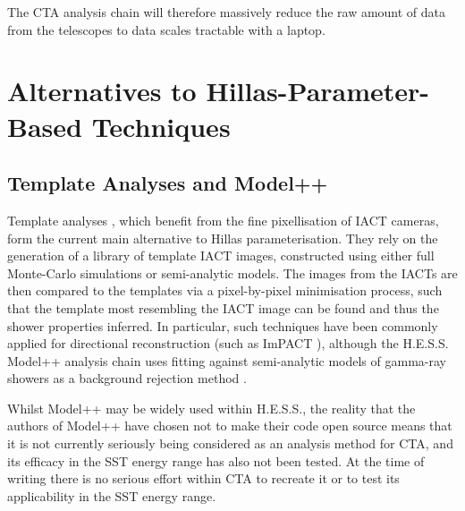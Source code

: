The CTA analysis chain will therefore massively reduce the raw amount of data from the telescopes to data scales tractable with a laptop.


\section{Alternatives to Hillas-Parameter-Based Techniques}

\subsection{Template Analyses and Model++}
Template analyses \cite{cat}\cite{3danalysis}\cite{model++}\cite{impact}, which benefit from the fine pixellisation of IACT cameras, form the current main alternative to Hillas parameterisation. They rely on the generation of a library of template IACT images, constructed using either full Monte-Carlo simulations or semi-analytic models. The images from the IACTs are then compared to the templates via a pixel-by-pixel minimisation process, such that the template most resembling the IACT image can be found and thus the shower properties inferred. In particular, such techniques have been commonly applied for directional reconstruction (such as ImPACT \cite{impact}), although the H.E.S.S. Model++ analysis chain uses fitting against semi-analytic models of gamma-ray showers as a background rejection method \cite{model++}.

Whilst Model++ may be widely used within H.E.S.S., the reality that the authors of Model++ have chosen not to make their code open source means that it is not currently seriously being considered as an analysis method for CTA, and its efficacy in the SST energy range has also not been tested. At the time of writing there is no serious effort within CTA to recreate it or to test its applicability in the SST energy range.

